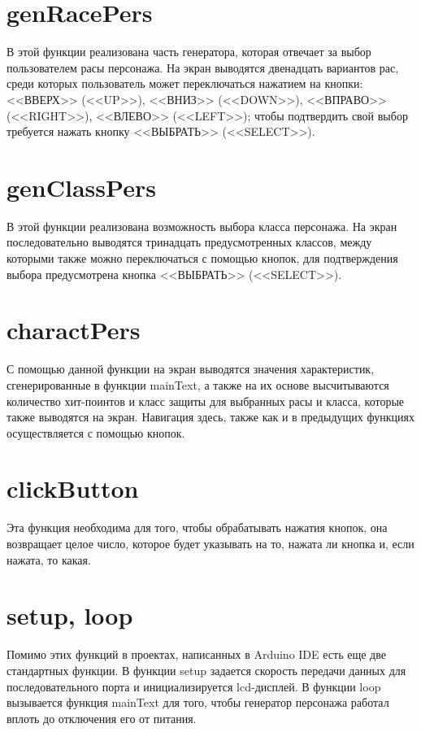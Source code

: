 \documentclass[12pt,a4paper]{article}
\begin{document}
\section{genRacePers}

В этой функции реализована часть генератора, которая отвечает за выбор пользователем расы персонажа. На экран выводятся двенадцать вариантов рас, среди которых пользователь может переключаться нажатием на кнопки: <<ВВЕРХ>> (<<UP>>), <<ВНИЗ>> (<<DOWN>>), <<ВПРАВО>> (<<RIGHT>>), <<ВЛЕВО>> (<<LEFT>>); чтобы подтвердить свой выбор требуется нажать кнопку <<ВЫБРАТЬ>> (<<SELECT>>).

\section{genClassPers}

В этой функции реализована возможность выбора класса персонажа. На экран последовательно выводятся тринадцать предусмотренных классов, между которыми также можно переключаться с помощью кнопок, для подтверждения выбора предусмотрена кнопка <<ВЫБРАТЬ>> (<<SELECT>>).

\section{charactPers}

С помощью данной функции на экран выводятся значения характеристик, сгенерированные в функции mainText, а также на их основе высчитываются количество хит-поинтов и класс защиты для выбранных расы и класса, которые также выводятся на экран. Навигация здесь, также как и в предыдущих функциях осуществляется с помощью кнопок.

\section{clickButton}

Эта функция необходима для того, чтобы обрабатывать нажатия кнопок, она возвращает целое число, которое будет указывать на то, нажата ли кнопка и, если нажата, то какая.

\section{setup, loop}

Помимо этих функций в проектах, написанных в Arduino IDE есть еще две стандартных функции. В функции setup задается скорость передачи данных для последовательного порта и инициализируется lcd-дисплей. В функции loop вызывается функция mainText для того, чтобы генератор персонажа работал вплоть до отключения его от питания.
\end{document}

